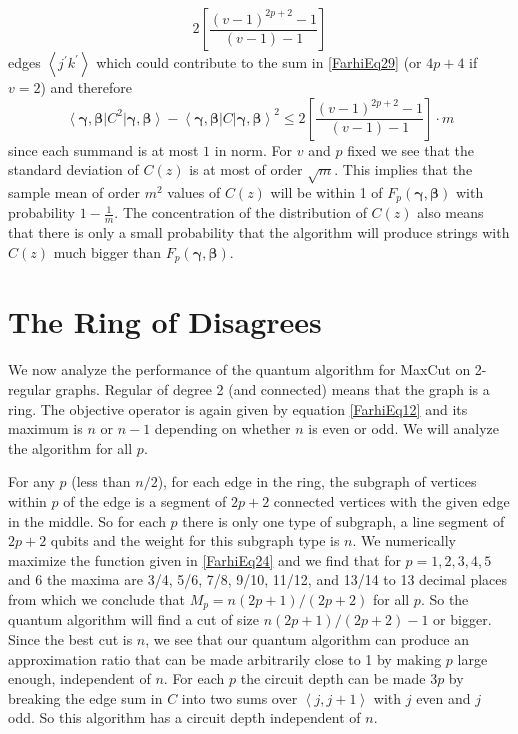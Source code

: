 \documentclass[t11pt,reprint,preprint,preprintnumbers]{revtex4}
\newcommand{\bra}[1]{\left\langle #1 \right|}
\newcommand{\ket}[1]{\left|#1\right\rangle}
\newcommand{\brake}[1]{\left\langle#1\right\rangle}
\begin{document}
\begin{equation}
 2 \left[ \frac{(v-1)^{2p+2} -1}{(v-1) -1}\right]
\label{FarhiEq30}
\end{equation}
edges $\brake{j^\prime k^\prime}$ which could contribute to the sum in \eqref{FarhiEq29} (or $4p+4$ if $v=2$) and therefore
\begin{equation}
\bra{\boldsymbol{\gamma}, \boldsymbol{\beta}} C^2\ket{\boldsymbol{\gamma}, \boldsymbol{\beta}} - \bra{\boldsymbol{\gamma}, \boldsymbol{\beta}} C \ket{\boldsymbol{\gamma}, \boldsymbol{\beta}}^2 \leqslant 2 \left[ \frac{(v-1)^{2p+2} -1}{(v-1) -1}\right] \cdot m
\label{FarhiEq31}
\end{equation}
since each summand is at most $1$ in norm. For $v$ and $p$ fixed we see that the standard deviation of $C(z)$ is at most of order $\sqrt{m}$. This implies that the sample mean of order $m^2$ values of $C(z)$ will be within 1 of $F_p (\boldsymbol{\gamma}, \boldsymbol{\beta})$ with probability $1- \frac{1}{m}$. The concentration of the distribution of $C(z)$ also means that there is only a small probability that the algorithm will produce strings with $C(z)$ much bigger than $F_p (\boldsymbol{\gamma}, \boldsymbol{\beta})$.

\section{The Ring of Disagrees}

	We now analyze the performance of the quantum algorithm for MaxCut on 2-regular graphs.  Regular of degree 2 (and connected) means that the graph is a ring.  The objective operator is again given by equation \eqref{FarhiEq12} and its maximum is $n$ or $n-1$ depending on whether $n$ is even or odd.  We will analyze the algorithm for all $p$.

	For any $p$ (less than $n/2$), for each edge in the ring, the subgraph of vertices within $p$ of the edge is a segment of $2p+2$ connected vertices with the given edge in the middle. So for each $p$ there is only one type of subgraph, a line segment of $2p+2$ qubits and the weight for this subgraph type is $n$. We numerically maximize the function given in \eqref{FarhiEq24} and we find that for $p=1, 2 ,3 ,4 ,5$ and 6 the maxima are 3/4, 5/6, 7/8, 9/10, 11/12, and 13/14 to 13 decimal places from which we conclude that $M_p=n(2p+1)/(2p+2)$ for all $p$.  So the quantum algorithm will find a cut of size  $n (2p+1)/(2p+2) - 1$ or bigger.  Since the best cut is $n$, we see that our quantum algorithm can produce an approximation ratio that can be made arbitrarily close to 1 by making $p$ large enough, independent of $n$.  For each $p$ the circuit depth can be made $3p$ by breaking the edge sum in $C$ into two sums over $\brake{ j, j+1}$ with $j$ even and $j$ odd. So this algorithm has a circuit depth independent of $n$.
\end{document}
